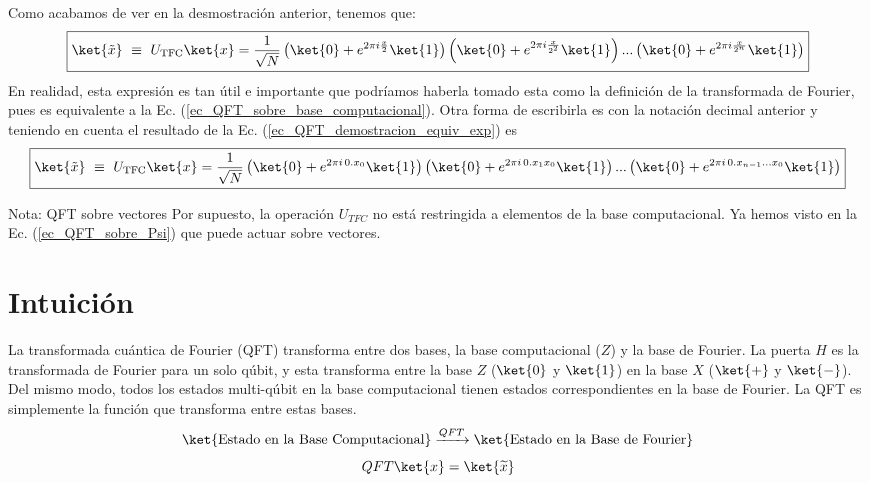 \documentclass[a4paper,11pt]{book} %
\numberwithin{equation}{chapter}
\begin{document}
Como acabamos de ver en la desmostración anterior, tenemos que:
	\begin{equation} \label{ec_QFT_ecuacion_desarrollada}
\boxed{\ket{\tilde x}  ~\equiv ~  U_{\rm TFC}\ket{x} = \frac{1}{\sqrt{N}} \left( \ket{0} + e^{2\pi i \frac{x}{2}}\ket{1}\right)\left( \ket{0} + e^{2\pi i \frac{x}{2^2}}\ket{1}\right)...\left( \ket{0} + e^{2\pi i \frac{x}{2^n}}\ket{1}\right)}
	\end{equation}
En realidad, esta expresión es tan útil e importante que podríamos haberla tomado esta como la definición de la transformada de Fourier, pues es equivalente a la Ec. (\ref{ec_QFT_sobre_base_computacional}). Otra forma de escribirla es con la notación decimal anterior y teniendo en cuenta el resultado de la Ec. (\ref{ec_QFT_demostracion_equiv_exp}) es 
	\begin{equation}
	\boxed{\ket{\tilde x}  ~\equiv ~  U_{\rm TFC}\ket{x} = \frac{1}{\sqrt{N}} \left( \ket{0} + e^{2\pi i \, 0.x_0}\ket{1}\right)\left( \ket{0} + e^{2\pi i \, 0.x_1x_0}\ket{1}\right)...\left( \ket{0} + e^{2\pi i \, 0.x_{n-1}...x_0}\ket{1}\right) }
	\end{equation}



	

	\begin{mybox_blue}{Nota: QFT sobre vectores}
	Por supuesto, la operación $U_{TFC}$ no está restringida a elementos de la base computacional. Ya hemos visto en la Ec. (\ref{ec_QFT_sobre_Psi}) que puede actuar sobre vectores.
	\end{mybox_blue}



	\section{Intuición}


La transformada cuántica de Fourier (QFT) transforma entre dos bases, la base computacional ($Z$) y la base de Fourier. La puerta $H$ es la transformada de Fourier para un solo qúbit, y esta transforma entre la base $Z$ ($\ket{0}$ y $\ket{1}$) en la base $X$ ($\ket{+}$ y $\ket{-}$). Del mismo modo, todos los estados multi-qúbit en la base computacional tienen estados correspondientes en la base de Fourier. La QFT es simplemente la función que transforma entre estas bases.
	\begin{equation*}
	\ket{\text{Estado en la Base Computacional}} \xrightarrow{QFT} \ket{\text{Estado en la Base de Fourier}}
 	\end{equation*}
	\begin{equation*}
	QFT \ket{x} = \ket{\widetilde{x}}
	\end{equation*}
\end{document}
